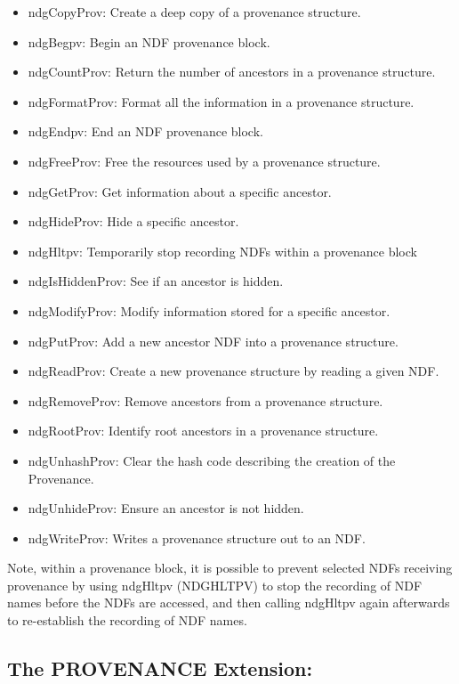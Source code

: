 \documentclass[twoside,11pt]{article}
\renewcommand{\_}{\texttt{\symbol{95}}}
\begin{document}
\begin{itemize}
   \item  ndgCopyProv: Create a deep copy of a provenance structure.
   \item  ndgBegpv: Begin an NDF provenance block.
   \item  ndgCountProv: Return the number of ancestors in a provenance structure.
   \item  ndgFormatProv: Format all the information in a provenance structure.
   \item  ndgEndpv: End an NDF provenance block.
   \item  ndgFreeProv: Free the resources used by a provenance structure.
   \item  ndgGetProv: Get information about a specific ancestor.
   \item  ndgHideProv: Hide a specific ancestor.
   \item  ndgHltpv: Temporarily stop recording NDFs within a provenance block
   \item  ndgIsHiddenProv: See if an ancestor is hidden.
   \item  ndgModifyProv: Modify information stored for a specific ancestor.
   \item  ndgPutProv: Add a new ancestor NDF into a provenance structure.
   \item  ndgReadProv: Create a new provenance structure by reading a given NDF.
   \item  ndgRemoveProv: Remove ancestors from a provenance structure.
   \item  ndgRootProv: Identify root ancestors in a provenance structure.
   \item  ndgUnhashProv: Clear the hash code describing the creation of the Provenance.
   \item  ndgUnhideProv: Ensure an ancestor is not hidden.
   \item  ndgWriteProv: Writes a provenance structure out to an NDF.
\end{itemize}

Note, within a provenance block, it is possible to prevent selected NDFs
receiving provenance by using ndgHltpv (NDG\_HLTPV) to stop the recording
of NDF names before the NDFs are accessed, and then calling ndgHltpv
again afterwards to re-establish the recording of NDF names.

\subsection{The PROVENANCE Extension:}
\end{document}
